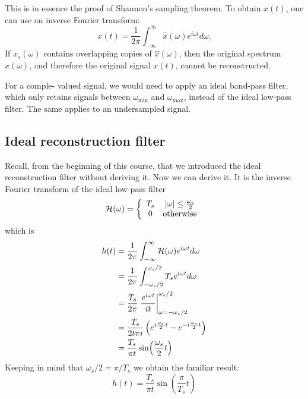 This is in essence the proof of Shannon's sampling theorem. To obtain $x(t)$, 
one can use an inverse Fourier transform:
\begin{equation}
  x(t) = \frac{1}{2\pi}\int_{-\infty}^{\infty} \hat{x}(\omega) e^{i\omega t}d\omega.
\end{equation}
If $\hat{x}_s(\omega)$ contains overlapping copies of $\hat{x}(\omega)$, then the original 
spectrum $\hat{x}(\omega)$, and therefore the original signal $x(t)$, cannot be reconstructed.

For a comple- valued signal, we would need to apply an ideal band-pass filter, which only 
retains signals between $\omega_{\mathrm{min}}$ and
$\omega_{\mathrm{max}}$, instead of the ideal low-pass filter. The same applies to an undersampled signal.

\subsection{Ideal reconstruction filter}
Recall, from the beginning of this course, that we introduced the ideal reconstruction filter without deriving it. 
Now we can derive it. It is the inverse Fourier transform of the ideal low-pass filter
\begin{equation}
  \mathcal{H}(\omega) = \left\{ \begin{array}{cc}
    T_s & |\omega| \le \frac{\omega_s}{2} \\
    0   & \mathrm{otherwise}
  \end{array}
  \right.
\end{equation}
which is
\begin{align}
  h(t) & = \frac{1}{2\pi}\int_{-\infty}^{\infty} \mathcal{H}(\omega) e^{i\omega t}d\omega                             \\
       & = \frac{1}{2\pi} \int_{-\omega_s/2}^{\omega_s/2} T_s e^{i\omega t}d\omega                     \\
       & = \frac{T_s}{2 \pi}\left. \frac{e^{i\omega t}}{it} \right|_{\omega=-\omega_s/2}^{\omega_s/2}  \\
       & = \frac{T_s}{2 t \pi i}\left( e^{i\frac{\omega_s}{2} t}  - e^{-i\frac{\omega_s}{2} t} \right) \\
       & = \frac{T_s}{\pi t} \sin(\frac{\omega_s}{2}t)                                                 
\end{align}
Keeping in mind that $\omega_s/2 = \pi/T_s$ we obtain the familiar result:
\begin{equation}
  \boxed{
    h(t) = \frac{T_s}{\pi t}\sin(\frac{\pi}{T_s}t)
  }
\end{equation}
